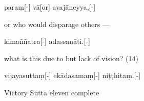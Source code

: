 \begin{samepage}
\begingl[glneveryline={\PaliGlossA,\PaliGlossB}]
paraṃ[-] vā[or] avajāneyya,[-]
\endgl
\nopagebreak
\linespread{0.5}
\begin{spacin}{0.2}
{\PaliGlossFT or who would disparage others —}
\end{spacin}
\vskip 12pt
\end{samepage}
\begin{samepage}
\begingl[glneveryline={\PaliGlossA,\PaliGlossB}]
kimaññatra[-] adassanāti.[-]
\endgl
\nopagebreak
\linespread{0.5}
\begin{spacin}{0.2}
{\PaliGlossFT what is this due to but lack of vision? (14)}
\end{spacin}
\vskip 12pt
\end{samepage}
\vskip 0.2in
\begin{samepage}
\begingl[glneveryline={\PaliGlossA,\PaliGlossB}]
vijayasuttaṃ[-] ekādasamaṃ[-] niṭṭhitaṃ.[-]
\endgl
\nopagebreak
\linespread{0.5}
\begin{spacin}{0.2}
{\PaliGlossFT Victory Sutta eleven complete}
\end{spacin}
\vskip 12pt
\end{samepage}